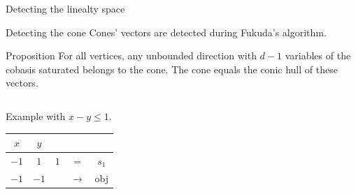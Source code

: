 \begin{frame}{Detecting the linealty space}
\end{frame}

\begin{frame}{Detecting the cone}
Cones' vectors are detected during Fukuda's algorithm.
\begin{block}{Proposition}
For all vertices, any unbounded direction with $d-1$ variables of the cobasis saturated belongs to the cone. The cone equals the conic hull of these vectors.
\end{block}


\vspace*{0.1cm}

\begin{columns}[c]
\begin{column}{5.5cm}
Example with $x-y\leq 1$.\\

\begin{tabular}{| c | c | c || c c |}
	\hline	
	$x$ & $y$ & & & \\
	\hline	
  	$-1$ & $1$ & $1$ & = & $s_1$\\ \hline	
   	$-1$ & $-1$ & & $\rightarrow$ & obj \\ \hline 
\end{tabular}

\vspace*{0.1cm}




\end{column}
\end{columns}
\end{frame}

